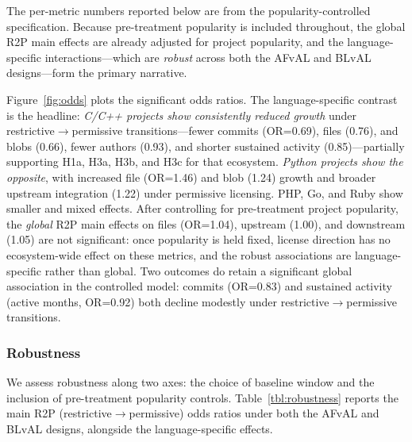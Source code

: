 The per-metric numbers reported below are from the popularity-controlled
specification. Because pre-treatment popularity is included throughout,
the global R2P main effects are already adjusted for project popularity,
and the language-specific interactions---which are \emph{robust} across
both the AFvAL and BLvAL designs---form the primary narrative.

Figure~\ref{fig:odds} plots the significant odds ratios. The
language-specific contrast is the headline: \emph{C/C++ projects show
consistently \emph{reduced} growth} under
restrictive$\rightarrow$permissive transitions---fewer commits
(OR=0.69), files (0.76), and blobs (0.66), fewer authors (0.93), and
shorter sustained activity (0.85)---partially supporting H1a, H3a, H3b,
and H3c for that ecosystem. \emph{Python projects show the opposite},
with increased file (OR=1.46) and blob (1.24) growth and broader
upstream integration (1.22) under permissive licensing. PHP, Go, and
Ruby show smaller and mixed effects. After controlling for pre-treatment
project popularity, the \emph{global} R2P main effects on files
(OR=1.04), upstream (1.00), and downstream (1.05) are not significant:
once popularity is held fixed, license direction has no ecosystem-wide
effect on these metrics, and the robust associations are
language-specific rather than global. Two outcomes do retain a
significant global association in the controlled model: commits (OR=0.83)
and sustained activity (active months, OR=0.92) both decline modestly
under restrictive$\rightarrow$permissive transitions.

\subsubsection{Robustness}\label{sec:robustness}

We assess robustness along two axes: the choice of baseline window and the
inclusion of pre-treatment popularity controls. Table~\ref{tbl:robustness}
reports the main R2P (restrictive$\rightarrow$permissive) odds ratios under
both the AFvAL and BLvAL designs, alongside the language-specific effects.

